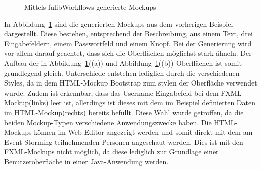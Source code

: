 \begin{figure}%
    \centering
    \qquad
    \caption{Mittels fulibWorkflows generierte Mockups}%
    \label{fig:mockups}%
\end{figure}

In Abbildung~\ref{fig:mockups} sind die generierten Mockups aus dem vorherigen Beispiel dargestellt.
Diese bestehen, entsprechend der Beschreibung, aus einem Text, drei Eingabefeldern, einem Passwortfeld und einem Knopf.
Bei der Generierung wird vor allem darauf geachtet, dass sich die Oberflächen möglichst stark ähneln.
Der Aufbau der in Abbildung~\ref{fig:mockups}((a)) und Abbildung~\ref{fig:mockups}((b)) Oberflächen ist somit grundlegend gleich.
Unterschiede entstehen lediglich durch die verschiedenen Styles, da in dem HTML-Mockup Bootstrap zum stylen der Oberfläche verwendet wurde.
Zudem ist erkennbar, dass das Username-Eingabefeld bei dem FXML-Mockup(links) leer ist, allerdings ist dieses mit dem im Beispiel definierten
Daten im HTML-Mockup(rechts) bereits befüllt.
Diese Wahl wurde getroffen, da die beiden Mockup-Typen verschiedene Anwendungszwecke haben.
Die HTML-Mockups können im Web-Editor angezeigt werden und somit direkt mit dem am Event Storming teilnehmenden Personen angeschaut werden.
Dies ist mit den FXML-Mockups nicht möglich, da diese lediglich zur Grundlage einer Benutzeroberfläche in einer Java-Anwendung werden.

